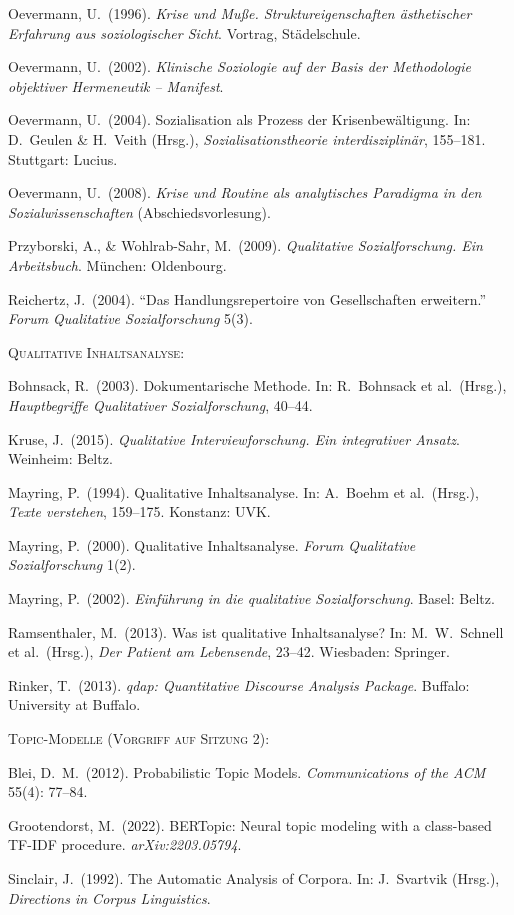 \documentclass[a4paper,11pt]{article}
\begin{document}
Oevermann, U.\ (1996). \emph{Krise und Muße. Struktureigenschaften
ästhetischer Erfahrung aus soziologischer Sicht}. Vortrag, Städelschule.

Oevermann, U.\ (2002). \emph{Klinische Soziologie auf der Basis der
Methodologie objektiver Hermeneutik -- Manifest}.

Oevermann, U.\ (2004). Sozialisation als Prozess der Krisenbewältigung.
In: D.\ Geulen \& H.\ Veith (Hrsg.), \emph{Sozialisationstheorie
interdisziplinär}, 155--181. Stuttgart: Lucius.

Oevermann, U.\ (2008). \emph{Krise und Routine als analytisches
Paradigma in den Sozialwissenschaften} (Abschiedsvorlesung).

Przyborski, A., \& Wohlrab-Sahr, M.\ (2009). \emph{Qualitative
Sozialforschung. Ein Arbeitsbuch}. München: Oldenbourg.

Reichertz, J.\ (2004). \enquote{Das Handlungsrepertoire von
Gesellschaften erweitern.} \emph{Forum Qualitative Sozialforschung}
5(3).

\bigskip

\textsc{Qualitative Inhaltsanalyse:}

Bohnsack, R.\ (2003). Dokumentarische Methode. In: R.\ Bohnsack
et al.\ (Hrsg.), \emph{Hauptbegriffe Qualitativer Sozialforschung},
40--44.

Kruse, J.\ (2015). \emph{Qualitative Interviewforschung. Ein
integrativer Ansatz}. Weinheim: Beltz.

Mayring, P.\ (1994). Qualitative Inhaltsanalyse. In: A.\ Boehm et al.\
(Hrsg.), \emph{Texte verstehen}, 159--175. Konstanz: UVK.

Mayring, P.\ (2000). Qualitative Inhaltsanalyse. \emph{Forum
Qualitative Sozialforschung} 1(2).

Mayring, P.\ (2002). \emph{Einführung in die qualitative
Sozialforschung}. Basel: Beltz.

Ramsenthaler, M.\ (2013). Was ist qualitative Inhaltsanalyse?
In: M.\ W.\ Schnell et al.\ (Hrsg.), \emph{Der Patient am Lebensende},
23--42. Wiesbaden: Springer.

Rinker, T.\ (2013). \emph{qdap: Quantitative Discourse Analysis
Package}. Buffalo: University at Buffalo.

\bigskip

\textsc{Topic-Modelle (Vorgriff auf Sitzung 2):}

Blei, D.\ M.\ (2012). Probabilistic Topic Models.
\emph{Communications of the ACM} 55(4): 77--84.

Grootendorst, M.\ (2022). BERTopic: Neural topic modeling with a
class-based TF-IDF procedure. \emph{arXiv:2203.05794}.

Sinclair, J.\ (1992). The Automatic Analysis of Corpora. In:
J.\ Svartvik (Hrsg.), \emph{Directions in Corpus Linguistics}.
\end{document}
